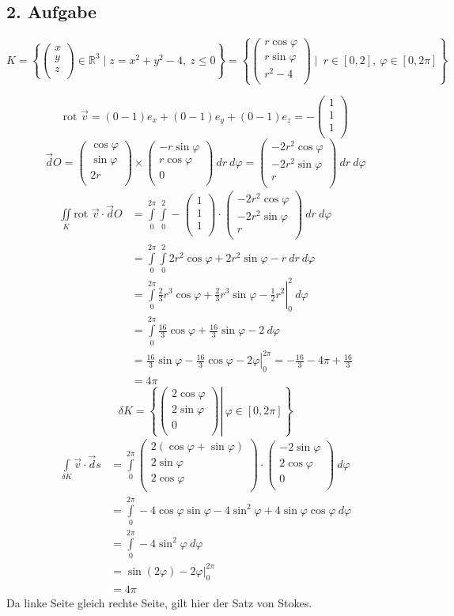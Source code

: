 \documentclass[10pt,a4paper,parskip=half]{scrartcl}
\newcommand{\R}{\mathbb{R}}
\newcommand{\vecthree}[3]{\begin{pmatrix}#1\\#2\\#3\\\end {pmatrix}}
\begin{document}
\subsection*{2. Aufgabe}
\[ K = \left\{  \vecthree{x}{y}{z} \in \R^3 \mid z = x^2 + y^2 - 4,~z \le 0  \right\}  = \left\{  \vecthree{r \cos \varphi}{r \sin \varphi}{r^2 - 4} \mid~ r \in [0,2] ,~ \varphi \in [0,2\pi] \right\} \]

\[ \text{rot } \vec v =  (0 - 1 )e_x + (0 - 1 )e_y + (0 - 1)e_z = -\vecthree{1}{1}{1}\]
\[ \vec dO = \vecthree{\cos \varphi}{\sin \varphi}{2r} \times \vecthree{-r\sin \varphi}{r\cos \varphi}{0} ~dr~ d\varphi = \vecthree{-2r^2 \cos \varphi}{-2r^2\sin \varphi}{r} ~dr~ d\varphi \]
\begin{align*}
\iint\limits_{K} \text{rot } \vec v \cdot \vec dO &= \int\limits_{0}^{2\pi}\int\limits_{0}^{2} -\vecthree{1}{1}{1} \cdot \vecthree{-2r^2 \cos \varphi}{-2r^2\sin \varphi}{r} ~dr~ d\varphi \\
&= \int\limits_{0}^{2\pi}\int\limits_{0}^{2} 2r^2\cos \varphi + 2r^2 \sin \varphi -r   ~dr~ d\varphi \\
&= \left.\int\limits_{0}^{2\pi} \frac 23 r^3 \cos \varphi + \frac 23 r^3 \sin \varphi - \frac 12 r^2 \right|_{0}^{2}   ~ d\varphi \\
&= \int\limits_{0}^{2\pi} \frac {16}3  \cos \varphi + \frac {16}{3} \sin \varphi - 2   ~ d\varphi \\
&= \left.\frac {16}3  \sin \varphi - \frac {16}{3} \cos \varphi - 2\varphi \right|_{0}^{2\pi}   
= - \frac {16}{3} - 4\pi + \frac{16}{3} \\
&= 4\pi
\end{align*}
\[ \delta K =  \left\{ \left. \vecthree{2 \cos \varphi}{2 \sin \varphi}{0} \right|~ \varphi \in [0,2\pi] \right\} \]
\begin{align*}
\int\limits_{\delta K} \vec v \cdot \vec ds &= \int\limits_{0}^{2\pi}\vecthree{2(\cos \varphi+ \sin \varphi)}{2\sin\varphi}{2\cos\varphi} \cdot \vecthree{-2\sin \varphi}{2\cos \varphi}{0} ~d\varphi \\
&= \int\limits_{0}^{2\pi} -4 \cos\varphi\sin \varphi -4 \sin^2 \varphi + 4\sin \varphi\cos\varphi ~d\varphi \\
&= \int\limits_{0}^{2\pi} -4 \sin^2 \varphi ~d\varphi \\
&= \left. \sin(2\varphi) - 2\varphi \right|^{2\pi}_0 \\
&= 4\pi
\end{align*}
Da linke Seite gleich rechte Seite, gilt hier der Satz von Stokes.
\end{document}
